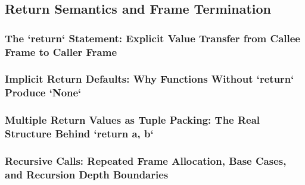 \subsection{Return Semantics and Frame Termination}
\subsubsection{The `return` Statement: Explicit Value Transfer from Callee Frame to Caller Frame}
\subsubsection{Implicit Return Defaults: Why Functions Without `return` Produce `None`}
\subsubsection{Multiple Return Values as Tuple Packing: The Real Structure Behind `return a, b`}
\subsubsection{Recursive Calls: Repeated Frame Allocation, Base Cases, and Recursion Depth Boundaries}
